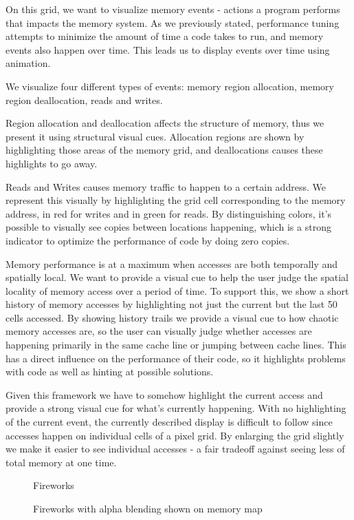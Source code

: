 \documentclass[annual]{acmsiggraph}
\begin{document}
  On this grid, we want to visualize memory events - actions a program performs that impacts the memory system. As we previously stated, performance tuning attempts to minimize the amount of time a code takes to run, and memory events also happen over time. This leads us to display events over time using animation. 
  
  We visualize four different types of events: memory region allocation, memory region deallocation, reads and writes.
  
  Region allocation and deallocation affects the structure of memory, thus we present it using structural visual cues. Allocation regions are shown by highlighting those areas of the memory grid, and deallocations causes these highlights to go away.
  
  Reads and Writes causes memory traffic to happen to a certain address. We represent this visually by highlighting the grid cell corresponding to the memory address, in red for writes and in green for reads. By distinguishing colors, it's possible to visually see copies between locations happening, which is a strong indicator to optimize the performance of code by doing zero copies.
    
  Memory performance is at a maximum when accesses are both temporally and spatially local. We want to provide a visual cue to help the user judge the spatial locality of memory access over a period of time. To support this, we show a short history of memory accesses by highlighting not just the current but the last 50 cells accessed. By showing history trails we provide a visual cue to how chaotic memory accesses are, so the user can visually judge whether accesses are happening primarily in the same cache line or jumping between cache lines. This has a direct influence on the performance of their code, so it highlights problems with code as well as hinting at possible solutions.
  
  Given this framework we have to somehow highlight the current access and provide a strong visual cue for what's currently happening. With no highlighting of the current event, the currently described display is difficult to follow since accesses happen on individual cells of a pixel grid. By enlarging the grid slightly we make it easier to see individual accesses - a fair tradeoff against seeing less of total memory at one time.
  
    	\begin{figure}[t]
  		\centering
      Fireworks
  		\caption{Fireworks with alpha blending shown on memory map}
      \label{fig:system}
  	\end{figure}
\end{document}
